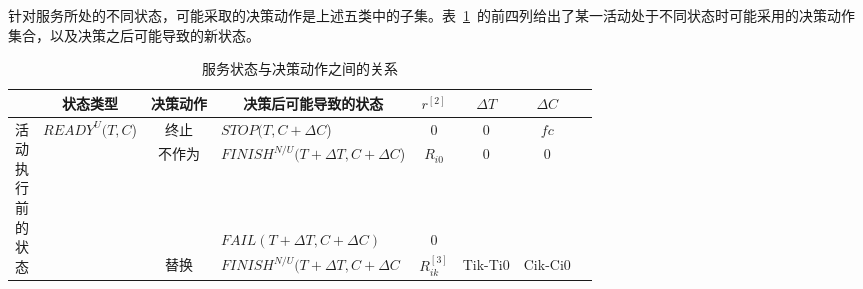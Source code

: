 针对服务所处的不同状态，可能采取的决策动作是上述五类中的子集。表~\ref{table:state_action}~的前四列给出了某一活动处于不同状态时可能采用的决策动作集合，以及决策之后可能导致的新状态。


\begin{table}[htbp]
      \caption{服务状态与决策动作之间的关系}
      \vspace{-0.5em}\label{table:state_action}\centering{}
    \begin{tabular}{rrrrrrrr}
        \toprule
        \multicolumn{1}{c|}{} 
        & \multicolumn{1}{c}{状态类型} 
        & \multicolumn{1}{|c}{决策动作} 
        & \multicolumn{1}{|c}{决策后可能导致的状态} 
        & \multicolumn{1}{|c}{$r^{[2]}$} 
        & \multicolumn{1}{|c}{$\Delta T$} 
        & \multicolumn{1}{|c}{$\Delta C$} \\
        \hline

        \multicolumn{1}{c|}{\multirow{9}{*}{\parbox{1em}{活\\动\\执\\行\\前\\的\\状\\态}}} 
        & \multirow{7}{*}{$READY^U(T,C$)} 
        & \multicolumn{1}{|c}{终止} 
        & \multicolumn{1}{|l}{$STOP(T, C+\Delta C$)} 
        & \multicolumn{1}{|c}{0} 
        & \multicolumn{1}{|c}{0} 
        & \multicolumn{1}{|c}{$fc$} \\
        \cline{3-7}

        \multicolumn{1}{c|}{} 
        &       
        & \multicolumn{1}{|c}{\multirow{2}{*}{不作为}} 
        & \multicolumn{1}{|l}{$FINISH^{N/U}(T+\Delta T, C+\Delta C$)} 
        & \multicolumn{1}{|c}{$R_{i0}$} 
        & \multicolumn{1}{|c}{\multirow{2}{*}{0}} 
        & \multicolumn{1}{|c}{\multirow{2}{*}{0}} \\

        \multicolumn{1}{c|}{} 
        &       
        & \multicolumn{1}{|c}{} 
        & \multicolumn{1}{|l}{$FAIL(T+\Delta T, C+\Delta C)$} 
        & \multicolumn{1}{|c}{0}
        & \multicolumn{1}{|c}{} 
        & \multicolumn{1}{|c}{} \\
        \cline{3-7}

        \multicolumn{1}{c|}{} 
        &       
        & \multicolumn{1}{|c}{\multirow{2}{*}{替换}} 
        & \multicolumn{1}{|l}{$FINISH^{N/U}(T+\Delta T, C+\Delta C$} 
        & \multicolumn{1}{|c}{$R_{ik}^{[3]}$} 
        & \multicolumn{1}{|c}{\multirow{2}{*}{Tik-Ti0}} 
        & \multicolumn{1}{|c}{\multirow{2}{*}{Cik-Ci0}} \\


\end{tabular}
\end{table}
